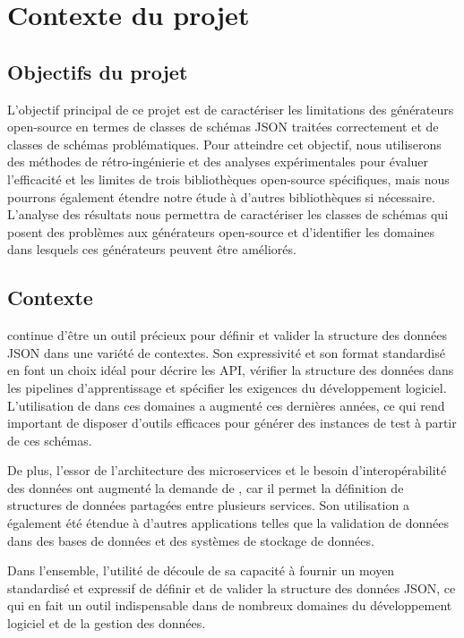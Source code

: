 \documentclass{article}
\begin{document}
\section{Contexte du projet}
    
    \subsection{Objectifs du projet}
L'objectif principal de ce projet est de caractériser les limitations des générateurs open-source en termes de classes de schémas JSON traitées correctement et de classes de schémas problématiques. Pour atteindre cet objectif, nous utiliserons des méthodes de rétro-ingénierie et des analyses expérimentales pour évaluer l'efficacité et les limites de trois bibliothèques open-source spécifiques, mais nous pourrons également étendre notre étude à d'autres bibliothèques si nécessaire. L'analyse des résultats nous permettra de caractériser les classes de schémas qui posent des problèmes aux générateurs open-source et d'identifier les domaines dans lesquels ces générateurs peuvent être améliorés.

    \subsection{Contexte}
\jsonsch continue d'être un outil précieux pour définir et valider la structure des données JSON dans une variété de contextes. Son expressivité et son format standardisé en font un choix idéal pour décrire les API, vérifier la structure des données dans les pipelines d'apprentissage et spécifier les exigences du développement logiciel. L'utilisation de \jsonsch dans ces domaines a augmenté ces dernières années, ce qui rend important de disposer d'outils efficaces pour générer des instances de test à partir de ces schémas.

De plus, l'essor de l'architecture des microservices et le besoin d'interopérabilité des données ont augmenté la demande de \jsonsch, car il permet la définition de structures de données partagées entre plusieurs services. Son utilisation a également été étendue à d'autres applications telles que la validation de données dans des bases de données et des systèmes de stockage de données.

Dans l'ensemble, l'utilité de \jsonsch découle de sa capacité à fournir un moyen standardisé et expressif de définir et de valider la structure des données JSON, ce qui en fait un outil indispensable dans de nombreux domaines du développement logiciel et de la gestion des données.
\end{document}
